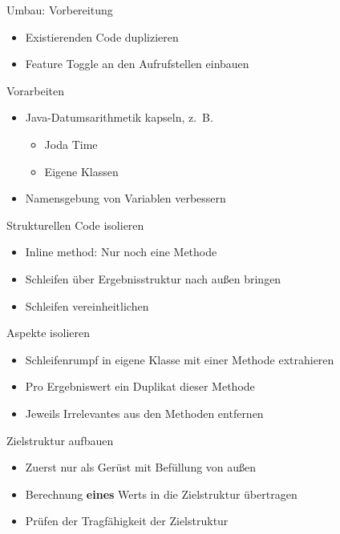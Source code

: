 \begin{frame}[t,fragile]{Umbau: Vorbereitung}
\begin{itemize}
\item Existierenden Code duplizieren
\item Feature Toggle an den Aufrufstellen einbauen
\end{itemize}
\end{frame}
 
\begin{frame}[t,fragile]{Vorarbeiten}
\begin{itemize}
\item Java-Datumsarithmetik kapseln, z.~B.
\begin{itemize}
\item Joda Time
\item Eigene Klassen
\end{itemize}
\item Namensgebung von Variablen verbessern
\end{itemize}
\end{frame}

\begin{frame}[t,fragile]{Strukturellen Code isolieren}
\begin{itemize}
\item Inline method: Nur noch eine Methode
\item Schleifen über Ergebnisstruktur nach außen bringen
\item Schleifen vereinheitlichen
\end{itemize}
\end{frame}

\begin{frame}[t,fragile]{Aspekte isolieren}
\begin{itemize}
\item Schleifenrumpf in eigene Klasse mit einer Methode extrahieren
\item Pro Ergebniswert ein Duplikat dieser Methode
\item Jeweils Irrelevantes aus den Methoden entfernen
\end{itemize}
\end{frame}

\begin{frame}[t,fragile]{Zielstruktur aufbauen}
\begin{itemize}
\item Zuerst nur als Gerüst mit Befüllung von außen
\item Berechnung \textbf{eines} Werts in die Zielstruktur übertragen
\item Prüfen der Tragfähigkeit der Zielstruktur
\end{itemize}
\end{frame}

